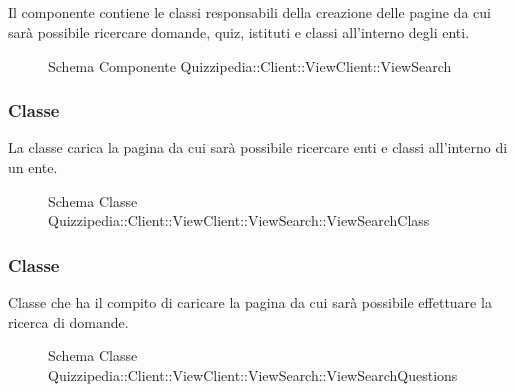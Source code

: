 \subsection{}
Il componente contiene le classi responsabili della creazione delle pagine da cui sarà possibile ricercare domande, quiz, istituti e classi all'interno degli enti.
\begin{figure}[H]
\centering
\noindent{}
\caption[Schema Componente Quizzipedia::Client::ViewClient::ViewSearch]{Schema Componente Quizzipedia::Client::ViewClient::ViewSearch}
\end{figure}
\subsubsection{Classe }
La classe carica la pagina da cui sarà possibile ricercare enti e classi all'interno di un ente.
\begin{figure}[H]
\centering
\noindent{}
\caption[Schema Classe ViewSearchClass]{Schema Classe Quizzipedia::Client::ViewClient::ViewSearch::ViewSearchClass}
\end{figure}
\subsubsection{Classe }
Classe che ha il compito di caricare la pagina da cui sarà possibile effettuare la ricerca di domande.
\begin{figure}[H]
\centering
\noindent{}
\caption[Schema Classe ViewSearchQuestions]{Schema Classe Quizzipedia::Client::ViewClient::ViewSearch::ViewSearchQuestions}
\end{figure}
